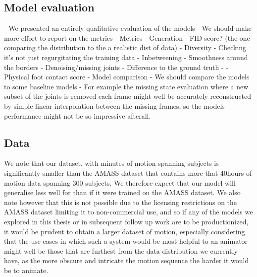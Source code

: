 \subsection{Model evaluation}
\label{sec:future_work_evaluation}
- We presented an entirely qualitative evaluation of the models
    - We should make more effort to report on the metrics
    - Metrics
        - Generation
            - FID score? (the one comparing the distribution to the a realistic dist of data)
            - Diversity
            - Checking it's not just regurgitating the training data
        - Inbetweening
            - Smoothness around the borders
        - Denoising/missing joints
            - Difference to the ground truth
        - \cite{EDGE}
            - Physical foot contact score
- Model comparison
    - We should compare the models to some baseline models
        - For example the missing state evaluation where a new subset of the joints is removed each frame might well be accurately reconstructed by simple linear interpolation between the missing frames, so the models performance might not be so impressive afterall.

            
\subsection{Data}
We note that our dataset, with  minutes of motion spanning  subjects is significantly smaller than the AMASS \cite{amass} dataset that contains more that 40hours of motion data spanning 300 subjects. We therefore expect that our model will generalise less well for than if it were trained on the AMASS dataset. We also note however that this is not possible due to the licensing restrictions on the AMASS dataset limiting it to non-commercial use, and so if any of the models we explored in this thesis or in subsequent follow up work are to be productionized, it would be prudent to obtain a larger dataset of motion, especially considering that the use cases in which such a system would be most helpful to an animator might well be those that are furthest from the data distribution we currently have, as the more obscure and intricate the motion sequence the harder it would be to animate.